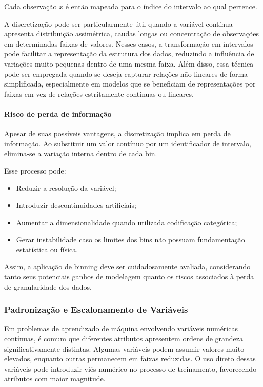 Cada observação \(x\) é então mapeada para o índice do intervalo ao qual pertence.

A discretização pode ser particularmente útil quando a variável contínua apresenta distribuição assimétrica, caudas longas ou concentração de observações em determinadas faixas de valores. Nesses casos, a transformação em intervalos pode facilitar a representação da estrutura dos dados, reduzindo a influência de variações muito pequenas dentro de uma mesma faixa. Além disso, essa técnica pode ser empregada quando se deseja capturar relações não lineares de forma simplificada, especialmente em modelos que se beneficiam de representações por faixas em vez de relações estritamente contínuas ou lineares.

\paragraph{Risco de perda de informação}

Apesar de suas possíveis vantagens, a discretização implica em perda de informação. Ao substituir um valor contínuo por um identificador de intervalo, elimina-se a variação interna dentro de cada bin.

Esse processo pode:

\begin{itemize}
    \item Reduzir a resolução da variável;
    \item Introduzir descontinuidades artificiais;
    \item Aumentar a dimensionalidade quando utilizada codificação categórica;
    \item Gerar instabilidade caso os limites dos bins não possuam fundamentação estatística ou física.
\end{itemize}

Assim, a aplicação de binning deve ser cuidadosamente avaliada, considerando tanto seus potenciais ganhos de modelagem quanto os riscos associados à perda de granularidade dos dados.

\subsubsection{Padronização e Escalonamento de Variáveis}

Em problemas de aprendizado de máquina envolvendo variáveis numéricas contínuas, é comum que diferentes atributos apresentem ordens de grandeza significativamente distintas. Algumas variáveis podem assumir valores muito elevados, enquanto outras permanecem em faixas reduzidas. O uso direto dessas variáveis pode introduzir viés numérico no processo de treinamento, favorecendo atributos com maior magnitude.

